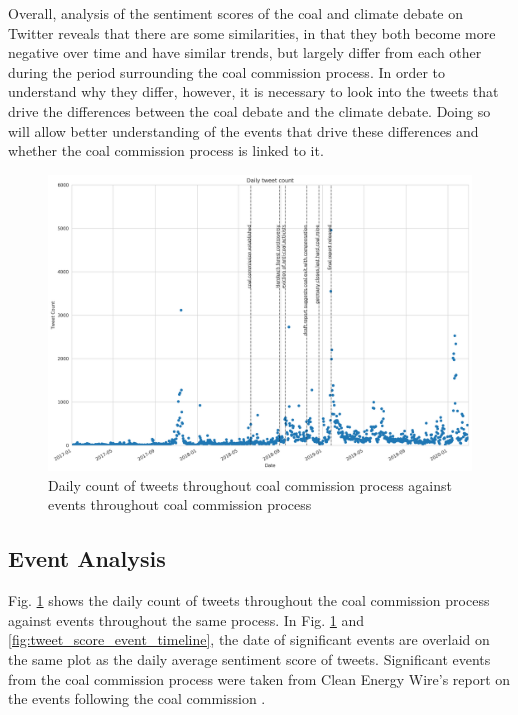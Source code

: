 \documentclass[12pt,onecolumn,twoside]{layout}
\begin{document}
Overall, analysis of the sentiment scores of the coal and climate debate on Twitter reveals that there are some similarities, in that they both become more negative over time and have similar trends, but largely differ from each other during the period surrounding the coal commission process. In order to understand why they differ, however, it is necessary to look into the tweets that drive the differences between the coal debate and the climate debate. Doing so will allow better understanding of the events that drive these differences and whether the coal commission process is linked to it. 

\begin{figure}
	\begin{center}
		\includegraphics[width=\textwidth]{figures/sa_tweet_count_event_timeline3}
	\end{center}
	\caption{Daily count of tweets throughout coal commission process against events throughout coal commission process}
	\label{fig:tweet_count_event_timeline}
\end{figure}


\subsection*{Event Analysis}
Fig. \ref{fig:tweet_count_event_timeline} shows the daily count of tweets throughout the coal commission process against events throughout the same process. In Fig. \ref{fig:tweet_count_event_timeline} and \ref{fig:tweet_score_event_timeline}, the date of significant events are overlaid on the same plot as the daily average sentiment score of tweets. Significant events from the coal commission process were taken from Clean Energy Wire's report on the events following the coal commission \cite{Amelang2019}. 
 
\end{document}
